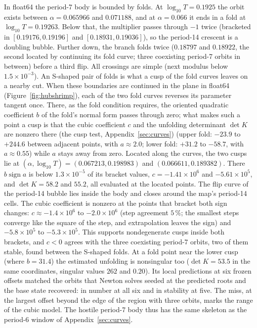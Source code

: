 \documentclass[11pt,letterpaper]{article}
\begin{document}
In float64 the period-7 body is bounded by folds. At $\log_{10}T=0.1925$ the orbit exists between $\alpha=0.065966$
and $0.071188$, and at $\alpha=0.066$ it ends in a fold at $\log_{10}T=0.19263$. Below that, the multiplier passes
through $-1$ twice (bracketed in $[0.19176,0.19196]$ and $[0.18931,0.19036]$), so the period-14 crescent is a
doubling bubble. Further down, the
branch folds twice ($0.18797$ and $0.18922$, the second located by continuing its fold curve; three coexisting period-7 orbits in between) before a third flip.
All crossings are simple (next modulus below $1.5\times10^{-3}$). An S-shaped pair of folds is what a cusp of the
fold curves leaves on a nearby cut. When these boundaries are continued in the plane in float64
(Figure~\ref{fig:hubshrimp}), each of the two fold curves reverses its parameter tangent once. There, as the fold condition requires, the oriented
quadratic coefficient $b$ of the fold's normal form passes through zero; what makes such a point a cusp is that the
cubic coefficient $c$ and the unfolding determinant $\det K$ are nonzero there (the cusp test, Appendix~\ref{sec:curves}) (upper fold: $-23.9$ to $+244.6$ between
adjacent points, with $a\approx2.0$; lower fold: $+31.2$ to $-58.7$, with $a\approx0.55$) while $a$ stays away from
zero. Located along the curves, the two cusps lie at $(\alpha,\log_{10}T)=(0.067213,0.198983)$ and
$(0.066611,0.189382)$. There $b\operatorname{sign}a$ is below $1.3\times10^{-5}$ of its bracket values,
$c=-1.41\times10^{6}$ and $-5.61\times10^{5}$, and $\det K=58.2$ and $55.2$, all evaluated at the located points.
The flip curve of the period-14 bubble lies inside the body and closes around the map's period-14 cells. The cubic
coefficient is nonzero at the points that bracket both sign changes: $c\approx-1.4\times10^{6}$ to $-2.0\times10^{6}$ (step agreement $5\,\%$; the
smallest steps converge like the square of the step, and extrapolation leaves the sign) and $-5.8\times10^{5}$ to
$-5.3\times10^{5}$. This supports nondegenerate cusps inside both brackets, and $c<0$ agrees with the three
coexisting period-7 orbits, two of them stable, found between the S-shaped folds. At a fold point near the lower
cusp (where $b=31.4$) the estimated unfolding is nonsingular too ($\det K=53.5$ in the same coordinates, singular
values $262$ and $0.20$). Its local predictions at six frozen offsets matched the orbits that Newton solves seeded at
the predicted roots and the base state recovered: in number at all six and in stability at five. The miss, at the largest
offset beyond the edge of the region with three orbits, marks the range of the cubic model. The hostile period-7 body
thus has the same skeleton as the period-6 window of Appendix~\ref{sec:curves}.
\end{document}
